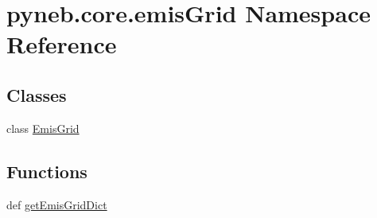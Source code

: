 \hypertarget{namespacepyneb_1_1core_1_1emis_grid}{\section{pyneb.\-core.\-emis\-Grid Namespace Reference}
\label{namespacepyneb_1_1core_1_1emis_grid}
}
\subsection*{Classes}
\begin{DoxyCompactItemize}
\item 
class \hyperlink{classpyneb_1_1core_1_1emis_grid_1_1_emis_grid}{Emis\-Grid}
\end{DoxyCompactItemize}
\subsection*{Functions}
\begin{DoxyCompactItemize}
\item 
def \hyperlink{namespacepyneb_1_1core_1_1emis_grid_a377d90568cd9c52e35ebae2ac9a3c386}{get\-Emis\-Grid\-Dict}
\end{DoxyCompactItemize}



